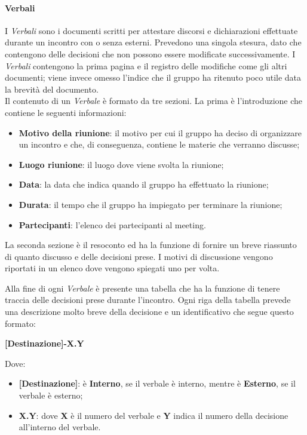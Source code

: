 \paragraph{Verbali}
I \textit{Verbali} sono i documenti scritti per attestare discorsi e dichiarazioni effettuate durante un incontro con o senza esterni. Prevedono una singola stesura, dato che contengono delle decisioni che non possono essere modificate successivamente. I \textit{Verbali} contengono la prima pagina e il registro delle modifiche come gli altri documenti; viene invece omesso l'indice che il gruppo ha ritenuto poco utile data la brevità del documento.\\ Il contenuto di un \textit{Verbale} è formato da tre sezioni. La prima è l'introduzione che contiene le seguenti informazioni:
\begin{itemize}
	
	\item \textbf{Motivo della riunione}: il motivo per cui il gruppo ha deciso di organizzare un incontro e che, di conseguenza, contiene le materie che verranno discusse;
	
	\item \textbf{Luogo riunione}: il luogo dove viene svolta la riunione;
	
	\item \textbf{Data}: la data che indica quando il gruppo ha effettuato la riunione;
	
	\item \textbf{Durata}: il tempo che il gruppo ha impiegato per terminare la riunione;
	
	\item \textbf{Partecipanti}: l'elenco dei partecipanti al meeting.
\end{itemize}

La seconda sezione è il resoconto ed ha la funzione di fornire un breve riassunto di quanto discusso e delle decisioni prese. I motivi di discussione vengono riportati in un elenco dove vengono spiegati uno per volta.

Alla fine di ogni \textit{Verbale} è presente una tabella che ha la funzione di tenere traccia delle decisioni prese durante l'incontro. Ogni riga della tabella prevede una descrizione molto breve della decisione e un identificativo che segue questo formato:
\begin{center}
\textbf{[Destinazione]-X.Y}
\end{center}
Dove: 

\begin{itemize}

	\item \textbf{[Destinazione]}: è \textbf{Interno}, se il verbale è interno, mentre è \textbf{Esterno}, se il verbale è esterno;
	
	\item \textbf{X.Y}: dove \textbf{X} è il numero del verbale e \textbf{Y} indica il numero della decisione all'interno del verbale.
\end{itemize}

